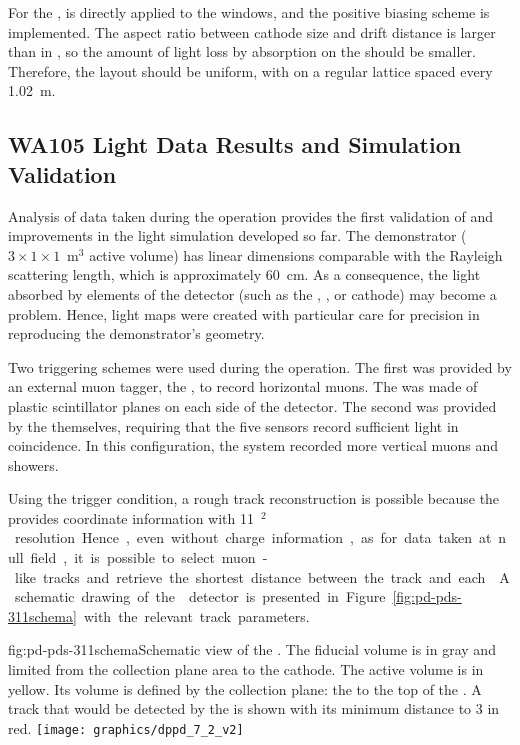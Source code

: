 For the  ,  is directly applied to the  windows, and the positive biasing scheme is implemented. The aspect ratio between cathode size and drift distance is larger than in , so the amount of light loss by absorption on the  should be smaller. Therefore, the   layout should be uniform, with  on a regular lattice spaced every \SI{1.02}{m}. 


\subsection{WA105 Light Data Results and Simulation Validation}

Analysis of data taken during the  operation provides the first validation of and improvements in the light simulation developed so far. 
The demonstrator ($3\times1\times1$~m$^3$ active volume) has linear dimensions comparable with the Rayleigh scattering length, which is approximately \SI{60}{\cm}. 
As a consequence, the light absorbed by elements of the detector (such as the , , or cathode) may become a problem.
Hence, light maps were created with particular care for precision in reproducing the demonstrator's geometry.

Two triggering schemes were used during the  operation.
The first was provided by an external muon tagger, the , to record horizontal muons. The  was made of plastic scintillator planes on each side of the detector.
The second was provided by the  themselves, requiring that the five sensors record sufficient light in coincidence. In this configuration, the system recorded more vertical muons and showers.

Using the  trigger condition, a rough track reconstruction is possible because the  provides coordinate information with \SI{11}{\cm$^2$} resolution. Hence, even without charge information, as for data taken at null field, it is possible to select muon-like tracks and retrieve the shortest distance between the track and each . A schematic drawing of the  detector is presented in Figure~\ref{fig:pd-pds-311schema} with the relevant track parameters.

\begin{dunefigure}{fig:pd-pds-311schema}{Schematic view of the . 
The fiducial volume is in gray and limited from the collection plane area to the cathode. The active volume is in yellow. Its volume is defined by the collection plane: the  to the top of the . A track that would be detected by the  is shown with its minimum distance to  \num{3} in red.}
\texttt{[image: graphics/dppd\_7\_2\_v2]}
\end{dunefigure}

